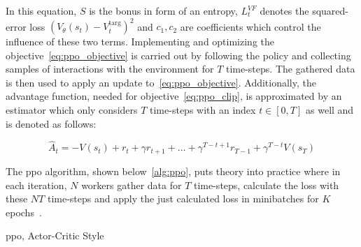 \documentclass[draft,final]{vutinfth} %
\newcommand{\p}[1]{see p. #1}
\begin{document}
    In this equation, $S$ is the bonus in form of an entropy, $L_t^{VF}$ denotes the squared-error loss $(V_\theta(s_t)-V_t^{\text{targ}})^2$ and $c_1,c_2$ are coefficients which control the influence of these two terms.
    Implementing and optimizing the objective~\ref{eq:ppo_objective} is carried out by following the policy and collecting samples of interactions with the environment for $T$ time-steps.
    The gathered data is then used to apply an update to~\ref{eq:ppo_objective}.
    Additionally, the advantage function, needed for objective~\ref{eq:ppo_clip}, is approximated by an estimator which only considers $T$ time-steps with an index $t\in [0,T]$ as well and is denoted as follows:

    \begin{equation}
        \hat{A}_t=-V(s_t)+r_t+\gamma r_{t+1} + \dots + \gamma^{T-t+1}r_{T-1} + \gamma^{T-t}V(s_T)\label{eq:advantage_estimator}
    \end{equation}

    The \gls{ppo} algorithm, shown below~\eqref{alg:ppo}, puts theory into practice where in each iteration, $N$ workers gather data for $T$ time-steps, calculate the loss with these $NT$ time-steps and apply the just calculated loss in minibatches for $K$ epochs~\citep{francois-lavet_introduction_2018}.
    \newpage
    \begin{algorithm}
        \caption[\acrlong{ppo}, Actor-Critic Style]{\gls{ppo}, Actor-Critic Style\protect\footnotemark}
        \label{alg:ppo}




    \end{algorithm}

    \footnotetext{\citep[\p{5}]{schulman_proximal_2017}}

    \glsresetall
\end{document}

